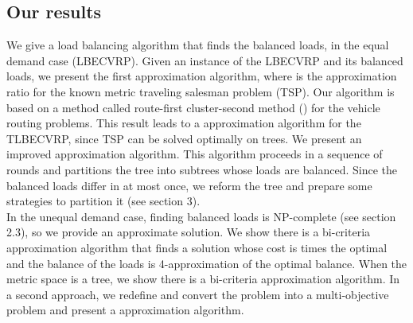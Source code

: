 \subsection{Our results}
\indent  We give a load balancing algorithm that finds the balanced loads, in the equal demand case (LBECVRP). Given an instance of the LBECVRP and its balanced loads, we present the first approximation algorithm, where  is the approximation ratio for the known metric traveling salesman problem (TSP). Our algorithm is based on a method called route-first cluster-second method  (\cite{Beasley}) for the vehicle routing problems. This result leads to a approximation algorithm for the TLBECVRP, since TSP can be solved optimally on trees. We present an improved approximation algorithm. This algorithm proceeds in a sequence of rounds and partitions the tree into subtrees whose loads are balanced. Since the balanced loads differ in at most once, we reform the tree and prepare some strategies to partition it (see section 3). \\
\indent In the unequal demand case, finding balanced loads is NP-complete (see section 2.3), so we provide an approximate solution. We show there is a  bi-criteria approximation algorithm that finds a solution whose cost is  times the optimal and the balance of the loads is 4-approximation of the optimal balance. When the metric space is a tree, we show there is a  bi-criteria approximation algorithm. In a second approach, we redefine and convert the problem into a multi-objective problem and present a approximation algorithm.
